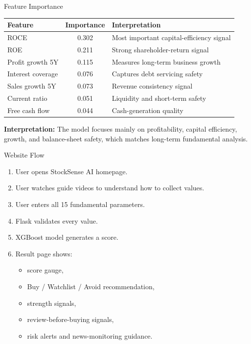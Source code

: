 \documentclass[aspectratio=169]{beamer}
\begin{document}
\begin{frame}{Feature Importance}
\small
\begin{tabular}{p{4.2cm} c p{6.0cm}}
\toprule
\textbf{Feature} & \textbf{Importance} & \textbf{Interpretation} \\
\midrule
ROCE & 0.302 & Most important capital-efficiency signal \\
ROE & 0.211 & Strong shareholder-return signal \\
Profit growth 5Y & 0.115 & Measures long-term business growth \\
Interest coverage & 0.076 & Captures debt servicing safety \\
Sales growth 5Y & 0.073 & Revenue consistency signal \\
Current ratio & 0.051 & Liquidity and short-term safety \\
Free cash flow & 0.044 & Cash-generation quality \\
\bottomrule
\end{tabular}

\vspace{0.25cm}
\textbf{Interpretation:} The model focuses mainly on profitability, capital efficiency, growth, and balance-sheet safety, which matches long-term fundamental analysis.
\end{frame}

\begin{frame}{Website Flow}
\small
\begin{enumerate}
  \item User opens StockSense AI homepage.
  \item User watches guide videos to understand how to collect values.
  \item User enters all 15 fundamental parameters.
  \item Flask validates every value.
  \item XGBoost model generates a score.
  \item Result page shows:
  \begin{itemize}
    \item score gauge,
    \item Buy / Watchlist / Avoid recommendation,
    \item strength signals,
    \item review-before-buying signals,
    \item risk alerts and news-monitoring guidance.
  \end{itemize}
\end{enumerate}
\end{frame}
\end{document}
